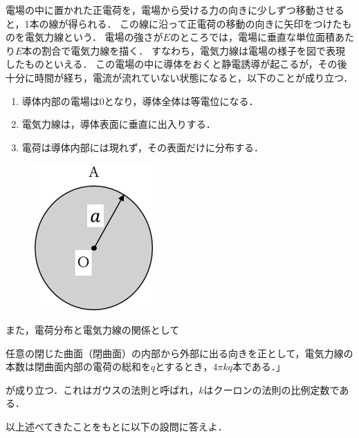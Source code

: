 \setcounter{figure}{0}
電場の中に置かれた正電荷を，電場から受ける力の向きに少しずつ移動させると，1本の線が得られる．
この線に沿って正電荷の移動の向きに矢印をつけたものを電気力線という．
電場の強さが$E$のところでは，電場に垂直な単位面積あたり$E$本の割合で電気力線を描く．
すなわち，電気力線は電場の様子を図で表現したものといえる．
この電場の中に導体をおくと静電誘導が起こるが，その後十分に時間が経ち，電流が流れていない状態になると，以下のことが成り立つ．
\begin{enumerate}
  \setlength{\leftskip}{0zw}
  \setlength{\itemindent}{1zw}\setlength{\labelsep}{1zw}
  \setlength{\labelwidth}{1zw}
  \item 導体内部の電場は0となり，導体全体は等電位になる．
  \item 電気力線は，導体表面に垂直に出入りする．
  \item 電荷は導体内部には現れず，その表面だけに分布する．
\end{enumerate}


{
\begin{figure}
  \vspace{-\intextsep}
  \includegraphics[width=6zw]{../graphs/open_19_8_2-1.png}
  \caption{}
\end{figure}



また，電荷分布と電気力線の関係として

任意の閉じた曲面（閉曲面）の内部から外部に出る向きを正として，電気力線の本数は閉曲面内部の電荷の総和を$q$とするとき，$4\pi kq$本である．」

\noindent
が成り立つ．これはガウスの法則と呼ばれ，$k$はクーロンの法則の比例定数である．

以上述べてきたことをもとに以下の設問に答えよ．
\par}

